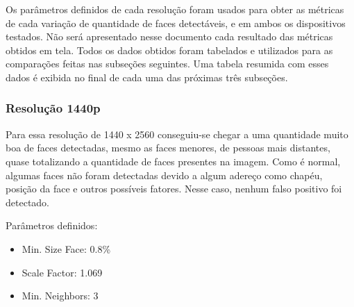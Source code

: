 Os parâmetros definidos de cada resolução foram usados para obter as métricas de cada variação de quantidade de faces detectáveis, e em ambos os dispositivos testados. Não será apresentado nesse documento cada resultado das métricas obtidos em tela. Todos os dados obtidos foram tabelados e utilizados para as comparações feitas nas subseções seguintes. Uma tabela resumida com esses dados é exibida no final de cada uma das próximas três subseções.


\subsubsection{Resolução 1440p} \label{sssec:resolution1-1}

Para essa resolução de 1440 x 2560 conseguiu-se chegar a uma quantidade muito boa de faces detectadas, mesmo as faces menores, de pessoas mais distantes, quase totalizando a quantidade de faces presentes na imagem. Como é normal, algumas faces não foram detectadas devido a algum adereço como chapéu, posição da face e outros possíveis fatores. Nesse caso, nenhum falso positivo foi detectado.

Parâmetros definidos: 
\begin{itemize}
    \SingleSpacing
    \item Min. Size Face: 0.8\%
    \item Scale Factor: 1.069
    \item Min. Neighbors: 3
\end{itemize}

